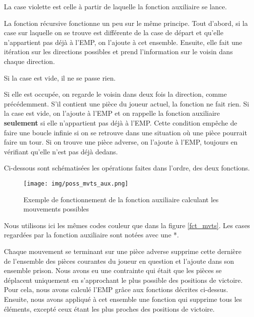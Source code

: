 \documentclass[a4paper]{article}
\begin{document}
\vspace{0.5cm}

La case violette est celle à partir de laquelle la fonction auxiliaire se lance.

\vspace{0.5cm}

La fonction récursive fonctionne un peu sur le même principe. Tout d'abord, si la case sur laquelle on se trouve est différente de la case de départ et qu'elle n'appartient pas déjà à l'EMP, on l'ajoute à cet ensemble. Ensuite, elle fait une itération sur les directions possibles et prend l'information sur le voisin dans chaque direction.

Si la case est vide, il ne se passe rien.

Si elle est occupée, on regarde le voisin dans deux fois la direction, comme précédemment. S'il contient une pièce du joueur actuel, la fonction ne fait rien. Si la case est vide, on l'ajoute à l'EMP et on rappelle la fonction auxiliaire \large\textbf{seulement} \normalsize si elle n'appartient pas déjà à l'EMP. Cette condition empêche de faire une boucle infinie si on se retrouve dans une situation où une pièce pourrait faire un tour. Si on trouve une pièce adverse, on l'ajoute à l'EMP, toujours en vérifiant qu'elle n'est pas déjà dedans.

Ci-dessous sont schématisées les opérations faites dans l'ordre, des deux fonctions.

\begin{figure}[H]
  \centering
  \texttt{[image: img/poss\_mvts\_aux.png]}
  \caption{Exemple de fonctionnement de la fonction auxiliaire calculant les mouvements possibles}
  \label{fig:fct_mvts_aux}
\end{figure}

Nous utilisons ici les mêmes codes couleur que dans la figure \ref{fct_mvts}. Les cases regardées par la fonction auxiliaire sont notées avec une *.

\vspace{0.5cm}

Chaque mouvement se terminant sur une pièce adverse supprime cette dernière de l'ensemble des pièces courantes du joueur en question et l'ajoute dans son ensemble prison.
Nous avons eu une contrainte qui était que les pièces se déplacent uniquement en s'approchant le plus possible des positions de victoire. Pour cela, nous avons calculé l'EMP grâce aux fonctions décrites ci-dessus. Ensuite, nous avons appliqué à cet ensemble une fonction qui supprime tous les éléments, excepté ceux étant les plus proches des positions de victoire.
\end{document}
